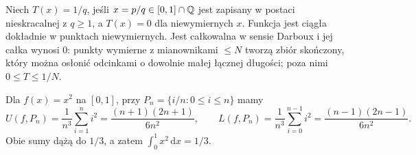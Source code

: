 \begin{przyklad}
Niech $T(x)=1/q$, jeśli $x=p/q\in[0,1]\cap\mathbb Q$ jest zapisany w postaci nieskracalnej z $q\ge1$, a $T(x)=0$ dla niewymiernych $x$. Funkcja jest ciągła dokładnie w punktach niewymiernych. Jest całkowalna w sensie Darboux i jej całka wynosi $0$: punkty wymierne z mianownikami $\le N$ tworzą zbiór skończony, który można osłonić odcinkami o dowolnie małej łącznej długości; poza nimi $0\le T\le1/N$.
\end{przyklad}
\begin{przyklad}
Dla $f(x)=x^2$ na $[0,1]$, przy $P_n=\{i/n:0\le i\le n\}$ mamy
\[
U(f,P_n)=\frac1{n^3}\sum_{i=1}^n i^2=\frac{(n+1)(2n+1)}{6n^2},\qquad
L(f,P_n)=\frac1{n^3}\sum_{i=0}^{n-1}i^2=\frac{(n-1)(2n-1)}{6n^2}.
\]
Obie sumy dążą do $1/3$, a zatem $\int_0^1x^2\,\mathrm dx=1/3$.
\end{przyklad}


